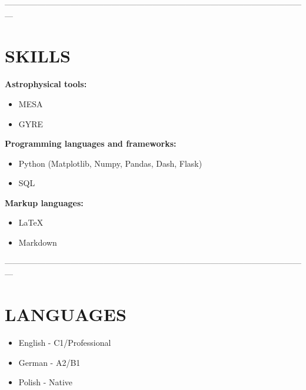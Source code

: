 \documentclass[margin, 10pt]{res} %
\begin{document}
\begin{resume}
---------------------------------------------------------------------------------------------------------------

\section{SKILLS}

\textbf{Astrophysical tools:}
\begin{itemize}[noitemsep]
    \item MESA
    \item GYRE
\end{itemize}

\textbf{Programming languages and frameworks:}
\begin{itemize}[noitemsep]
    \item Python (Matplotlib, Numpy, Pandas, Dash, Flask)
    \item SQL
\end{itemize}

\textbf{Markup languages:}
\begin{itemize}[noitemsep]
    \item \LaTeX
    \item Markdown
\end{itemize}

---------------------------------------------------------------------------------------------------------------

\section{LANGUAGES}

\begin{itemize}[noitemsep]
    \item English - C1/Professional
    \item German - A2/B1
    \item Polish - Native
\end{itemize}


\end{resume}

\end{document}

